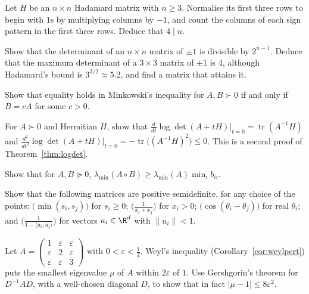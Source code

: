 \begin{exercise}[$\star\star$]\label{ex:hadamard4}
Let $H$ be an $n\times n$ Hadamard matrix with $n\ge3$. Normalise its first three rows to begin with $1$s by multiplying columns by
$-1$, and count the columns of each sign pattern in the first three rows. Deduce that $4\mid n$.
\end{exercise}

\begin{exercise}[$\star\star$]\label{ex:maxdet3}
Show that the determinant of an $n\times n$ matrix of $\pm1$ is divisible by $2^{n-1}$. Deduce that the maximum determinant of a $3\times3$
matrix of $\pm1$ is $4$, although Hadamard's bound is $3^{3/2}\approx5.2$, and find a matrix that attains it.
\end{exercise}

\begin{exercise}[$\star$]\label{ex:minkowskieq}
Show that equality holds in Minkowski's inequality for $A,B\succ0$ if and only if $B=cA$ for some $c>0$.
\end{exercise}

\begin{exercise}[$\star\star$]\label{ex:logdetderiv}
For $A\succ0$ and Hermitian $H$, show that $\frac d{dt}\log\det(A+tH)\big|_{t=0}=\operatorname{tr}(A^{-1}H)$ and
$\frac{d^2}{dt^2}\log\det(A+tH)\big|_{t=0}=-\operatorname{tr}\bigl((A^{-1}H)^2\bigr)\le0$. This is a second proof of Theorem~\ref{thm:logdet}.
\end{exercise}

\begin{exercise}[$\star\star$]\label{ex:schurmin}
Show that for $A,B\succeq0$, $\lambda_{\min}(A\circ B)\ge\lambda_{\min}(A)\min_ib_{ii}$.
\end{exercise}

\begin{exercise}[$\star\star$]\label{ex:kernels}
Show that the following matrices are positive semidefinite, for any choice of the points: $\bigl(\min(s_i,s_j)\bigr)$ for $s_i\ge0$;
$\bigl(\frac1{x_i+x_j}\bigr)$ for $x_i>0$; $\bigl(\cos(\theta_i-\theta_j)\bigr)$ for real $\theta_i$; and $\bigl(\frac1{1-\langle u_i,u_j\rangle}\bigr)$
for vectors $u_i\in\R^d$ with $\|u_i\|<1$.
\end{exercise}

\begin{exercise}[$\star$]\label{ex:gershscale}
Let $A=\begin{pmatrix}1&\varepsilon&\varepsilon\\\varepsilon&2&\varepsilon\\\varepsilon&\varepsilon&3\end{pmatrix}$ with $0<\varepsilon<\frac14$. Weyl's
inequality (Corollary~\ref{cor:weylpert}) puts the smallest eigenvalue $\mu$ of $A$ within $2\varepsilon$ of $1$. Use Gershgorin's theorem
for $D^{-1}AD$, with a well-chosen diagonal $D$, to show that in fact $|\mu-1|\le8\varepsilon^2$.
\end{exercise}

